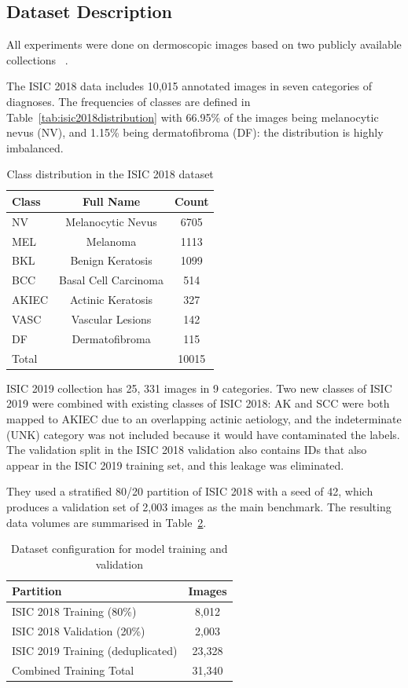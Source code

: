 \documentclass[conference]{IEEEtran}
\begin{document}
\subsection{Dataset Description}

All experiments were done on dermoscopic images based on two publicly available collections ~\cite{tschandl2018ham10000, combalia2019bcn20000}.

The ISIC 2018 data includes 10,015 annotated images in seven categories of diagnoses. The frequencies of classes are defined in Table~\ref{tab:isic2018distribution} with 66.95\% of the images being melanocytic nevus (NV), and 1.15\% being dermatofibroma (DF): the distribution is highly imbalanced.


\begin{table}[h]
\centering
\caption{Class distribution in the ISIC 2018 dataset}
\label{tab:isic2018_distribution}
\begin{tabular}{lcc}
\hline
Class & Full Name & Count \\
\hline
NV & Melanocytic Nevus & 6705 \\
MEL & Melanoma & 1113 \\
BKL & Benign Keratosis & 1099 \\
BCC & Basal Cell Carcinoma & 514 \\
AKIEC & Actinic Keratosis & 327 \\
VASC & Vascular Lesions & 142 \\
DF & Dermatofibroma & 115 \\
\hline
Total & & 10015 \\
\hline
\end{tabular}
\end{table}

ISIC 2019 collection has 25, 331 images in 9 categories. Two new classes of ISIC 2019 were combined with existing classes of ISIC 2018: AK and SCC were both mapped to AKIEC due to an overlapping actinic aetiology, and the indeterminate (UNK) category was not included because it would have contaminated the labels. The validation split in the ISIC 2018 validation also contains IDs that also appear in the ISIC 2019 training set, and this leakage was eliminated.

They used a stratified 80/20 partition of ISIC 2018 with a seed of 42, which produces a validation set of 2,003 images as the main benchmark. The resulting data volumes are summarised in Table~\ref{tab:dataset_split}.

\begin{table}[h]
\centering
\caption{Dataset configuration for model training and validation}
\label{tab:dataset_split}
\begin{tabular}{lc}
\hline
Partition & Images \\
\hline
ISIC 2018 Training (80\%) & 8,012 \\
ISIC 2018 Validation (20\%) & 2,003 \\
ISIC 2019 Training (deduplicated) & 23,328 \\
\hline
Combined Training Total & 31,340 \\
\hline
\end{tabular}
\end{table}
\end{document}
